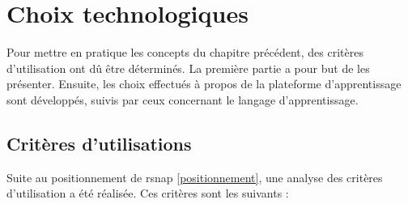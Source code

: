 \section{Choix technologiques}
\label{techno}
Pour mettre en pratique les concepts du chapitre précédent, des critères d'utilisation ont dû être déterminés. La première partie a pour but de les présenter. Ensuite, les choix effectués à propos de la plateforme d'apprentissage sont développés, suivis par ceux concernant le langage d'apprentissage.

\subsection{Critères d'utilisations}
Suite au positionnement de \gls{rsnap} \ref{positionnement}, une analyse des critères d'utilisation a été réalisée. Ces critères sont les suivants :

